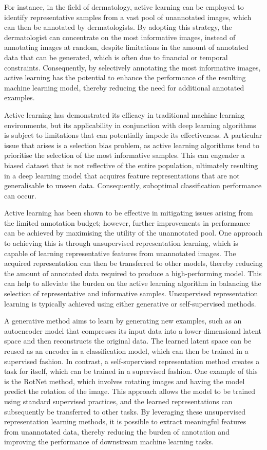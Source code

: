 For instance, in the field of dermatology, active learning can be employed to identify representative samples from a vast pool of unannotated images, which can then be annotated by dermatologists. By adopting this strategy, the dermatologist can concentrate on the most informative images, instead of annotating images at random, despite limitations in the amount of annotated data that can be generated, which is often due to financial or temporal constraints. Consequently, by selectively annotating the most informative images, active learning has the potential to enhance the performance of the resulting machine learning model, thereby reducing the need for additional annotated examples.

Active learning has demonstrated its efficacy in traditional machine learning environments, but its applicability in conjunction with deep learning algorithms is subject to limitations that can potentially impede its effectiveness. A particular issue that arises is a selection bias problem, as active learning algorithms tend to prioritise the selection of the most informative samples. This can engender a biased dataset that is not reflective of the entire population, ultimately resulting in a deep learning model that acquires feature representations that are not generalisable to unseen data. Consequently, suboptimal classification performance can occur.

Active learning has been shown to be effective in mitigating issues arising from the limited annotation budget; however, further improvements in performance can be achieved by maximising the utility of the unannotated pool. One approach to achieving this is through unsupervised representation learning, which is capable of learning representative features from unannotated images. The acquired representation can then be transferred to other models, thereby reducing the amount of annotated data required to produce a high-performing model. This can help to alleviate the burden on the active learning algorithm in balancing the selection of representative and informative samples. Unsupervised representation learning is typically achieved using either generative or self-supervised methods.

A generative method aims to learn by generating new examples, such as an autoencoder model that compresses its input data into a lower-dimensional latent space and then reconstructs the original data. The learned latent space can be reused as an encoder in a classification model, which can then be trained in a supervised fashion. In contrast, a self-supervised representation method creates a task for itself, which can be trained in a supervised fashion. One example of this is the RotNet method, which involves rotating images and having the model predict the rotation of the image. This approach allows the model to be trained using standard supervised practices, and the learned representations can subsequently be transferred to other tasks. By leveraging these unsupervised representation learning methods, it is possible to extract meaningful features from unannotated data, thereby reducing the burden of annotation and improving the performance of downstream machine learning tasks.

